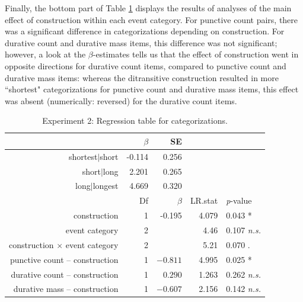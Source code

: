 \documentclass[review,12pt,authoryear]{elsarticle}
\begin{document}
Finally, the bottom part of Table \ref{tab_regrCat} displays the results of analyses of the main effect of construction within each event category. For punctive count pairs, there was a significant difference in categorizations depending on construction. For durative count and durative mass items, this difference was not significant; however, a look at the $\beta$-estimates tells us that the effect of construction went in opposite directions for durative count items, compared to punctive count and durative mass items: whereas the ditransitive construction resulted in more ``shortest" categorizations for punctive count and durative mass items, this effect was absent (numerically: reversed) for the durative count items.

\begin{table}[ht]
\centering
\begin{tabular}{rrrrl}
  \hline
 & $\beta$ & SE &  &  \\ 
  \hline
shortest$|$short & -0.114 & 0.256 &  &  \\ 
  short$|$long & 2.201 & 0.265 &  &  \\ 
  long$|$longest & 4.669 & 0.320 &  &  \\ \hline \hline
  & Df &$\beta$ & LR.stat &  \emph{p}-value \\ \hline
 construction & 1 & -0.195 & 4.079 & 0.043 *\\ 
 event category & 2 & & 4.46 & 0.107 \emph{n.s.} \\ 
  construction $\times$ event category & 2 & & 5.21 & 0.070 . \\  \hline
  
   punctive count -- construction    & 1 & $-0.811$ & 4.995 & 0.025 * \\    
   durative count -- construction    & 1  & $0.290$ & 1.263 & 0.262 \emph{n.s.} \\ 
   durative mass -- construction   & 1 & $-0.607$ & 2.156 & 0.142 \emph{n.s.} \\ \hline

\end{tabular}
\caption{Experiment 2: Regression table for categorizations. }
\label{tab_regrCat}
\end{table}
\end{document}
